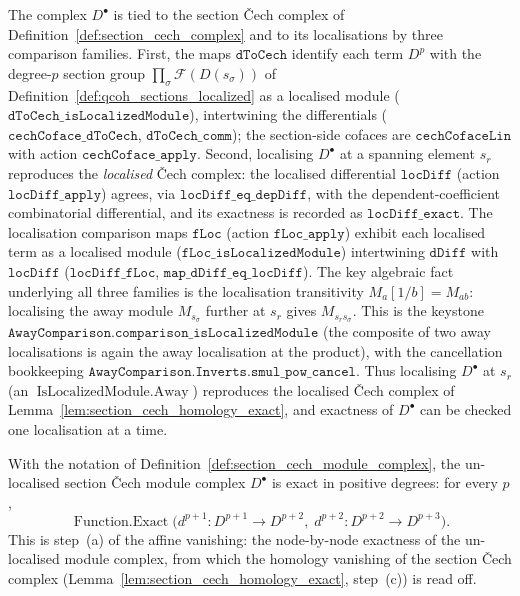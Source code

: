 \begin{definition}
  The complex \(D^\bullet\) is tied to the section {\v C}ech complex of
  Definition~\ref{def:section_cech_complex} and to its localisations by three
  comparison families. First, the maps \(\mathtt{dToCech}\) identify each term
  \(D^p\) with the degree-\(p\) section group
  \(\prod_\sigma \mathcal{F}(D(s_\sigma))\) of
  Definition~\ref{def:qcoh_sections_localized} as a localised module
  (\(\mathtt{dToCech\_isLocalizedModule}\)), intertwining the differentials
  (\(\mathtt{cechCoface\_dToCech}\), \(\mathtt{dToCech\_comm}\)); the section-side
  cofaces are \(\mathtt{cechCofaceLin}\) with action \(\mathtt{cechCoface\_apply}\).
  Second, localising \(D^\bullet\) at a spanning element \(s_r\) reproduces the
  \emph{localised} {\v C}ech complex: the localised differential \(\mathtt{locDiff}\)
  (action \(\mathtt{locDiff\_apply}\)) agrees, via
  \(\mathtt{locDiff\_eq\_depDiff}\), with the dependent-coefficient combinatorial
  differential, and its exactness is recorded as \(\mathtt{locDiff\_exact}\). The
  localisation comparison maps \(\mathtt{fLoc}\) (action \(\mathtt{fLoc\_apply}\))
  exhibit each localised term as a localised module
  (\(\mathtt{fLoc\_isLocalizedModule}\)) intertwining \(\mathtt{dDiff}\) with
  \(\mathtt{locDiff}\) (\(\mathtt{locDiff\_fLoc}\), \(\mathtt{map\_dDiff\_eq\_locDiff}\)).
  The key algebraic fact underlying all three families is the localisation
  transitivity \(M_a[1/b] = M_{ab}\): localising the away module \(M_{s_\sigma}\)
  further at \(s_r\) gives \(M_{s_r s_\sigma}\). This is the keystone
  \(\mathtt{AwayComparison.comparison\_isLocalizedModule}\) (the composite of two away
  localisations is again the away localisation at the product), with the cancellation
  bookkeeping \(\mathtt{AwayComparison.Inverts.smul\_pow\_cancel}\). Thus localising
  \(D^\bullet\) at \(s_r\) (an \(\operatorname{IsLocalizedModule.Away}\)) reproduces
  the localised Čech complex of Lemma~\ref{lem:section_cech_homology_exact}, and
  exactness of \(D^\bullet\) can be checked one localisation at a time.
\end{definition}

\begin{lemma}

  \label{lem:section_cech_module_exact}
  With the notation of Definition~\ref{def:section_cech_module_complex}, the
  un-localised section {\v C}ech module complex \(D^\bullet\) is exact in positive
  degrees: for every \(p\),
  \[
    \operatorname{Function.Exact}\bigl(d^{p+1} : D^{p+1} \to D^{p+2},\;
      d^{p+2} : D^{p+2} \to D^{p+3}\bigr).
  \]
  This is step~(a) of the affine vanishing: the node-by-node exactness of the
  un-localised module complex, from which the homology vanishing of the section
  {\v C}ech complex (Lemma~\ref{lem:section_cech_homology_exact}, step~(c)) is read off.
\end{lemma}

